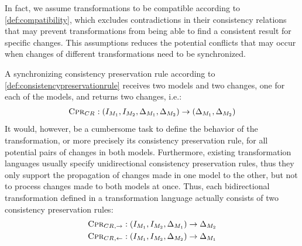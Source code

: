 In fact, we assume transformations to be compatible according to \autoref{def:compatibility}, which excludes contradictions in their consistency relations that may prevent transformations from being able to find a consistent result for specific changes.
This assumptions reduces the potential conflicts that may occur when changes of different transformations need to be synchronized.

A synchronizing consistency preservation rule according to \autoref{def:consistencypreservationrule} receives two models and two changes, one for each of the models, and returns two changes, i.e.:
\begin{align*}
    \textsc{Cpr}_{CR_{}} : (I_{M_{1}}, I_{M_{2}}, \Delta_{M_{1}}, \Delta_{M_{2}}) \rightarrow (\Delta_{M_{1}}, \Delta_{M_{2}})
\end{align*}
It would, however, be a cumbersome task to define the behavior of the transformation, or more precisely its consistency preservation rule, for all potential pairs of changes in both models.
Furthermore, existing transformation languages usually specify unidirectional consistency preservation rules, thus they only support the propagation of changes made in one model to the other, but not to process changes made to both models at once. Thus, each bidirectional transformation defined in a transformation language actually consists of two consistency preservation rules:
\begin{align*}
    \textsc{Cpr}_{CR_{},\rightarrow} : (I_{M_{1}}, I_{M_{2}}, \Delta_{M_{1}}) \rightarrow \Delta_{M_{2}}\\
    \textsc{Cpr}_{CR_{},\leftarrow} : (I_{M_{1}}, I_{M_{2}}, \Delta_{M_{2}}) \rightarrow \Delta_{M_{1}}
\end{align*}


